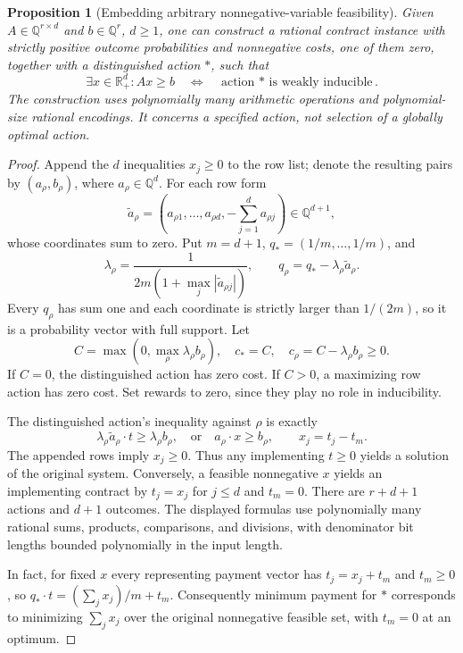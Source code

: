 \documentclass[11pt,a4paper]{article}
\newtheorem{proposition}[theorem]{Proposition}
\theoremstyle{definition}\newtheorem{definition}[theorem]{Definition}
\theoremstyle{remark}\newtheorem{remark}[theorem]{Remark}
\newcommand{\R}{\mathbb R}\newcommand{\Q}{\mathbb Q}
\newcommand{\1}{\mathbf 1}
\begin{document}
\begin{proposition}[Embedding arbitrary nonnegative-variable feasibility]\label{prop:embed}
Given $A\in\Q^{r\times d}$ and $b\in\Q^r$, $d\ge1$, one can construct a rational contract instance with strictly positive outcome probabilities and nonnegative costs, one of them zero, together with a distinguished action $*$, such that
\[
 \exists x\in\R_+^d:Ax\ge b
 \quad\Longleftrightarrow\quad
 \text{action $*$ is weakly inducible}.
\]
The construction uses polynomially many arithmetic operations and polynomial-size rational encodings. It concerns a specified action, not selection of a globally optimal action.
\end{proposition}
\begin{proof}
Append the $d$ inequalities $x_j\ge0$ to the row list; denote the resulting pairs by $(a_\rho,b_\rho)$, where $a_\rho\in\Q^d$. For each row form
\[
 \widetilde a_\rho=(a_{\rho1},\ldots,a_{\rho d},-\sum_{j=1}^d a_{\rho j})\in\Q^{d+1},
\]
whose coordinates sum to zero. Put $m=d+1$, $q_*=(1/m,\ldots,1/m)$, and
\[
 \lambda_\rho=\frac{1}{2m(1+\max_j|\widetilde a_{\rho j}|)},\qquad
 q_\rho=q_*-\lambda_\rho\widetilde a_\rho.
\]
Every $q_\rho$ has sum one and each coordinate is strictly larger than $1/(2m)$, so it is a probability vector with full support. Let
\[
 C=\max(0,\max_\rho\lambda_\rho b_\rho),\quad
 c_*=C,\quad c_\rho=C-\lambda_\rho b_\rho\ge0.
\]
If $C=0$, the distinguished action has zero cost. If $C>0$, a maximizing row action has zero cost. Set rewards to zero, since they play no role in inducibility.

The distinguished action's inequality against $\rho$ is exactly
\[
 \lambda_\rho\widetilde a_\rho\cdot t\ge\lambda_\rho b_\rho,
 \quad\text{or}\quad
 a_\rho\cdot x\ge b_\rho,
 \qquad x_j=t_j-t_m.
\]
The appended rows imply $x_j\ge0$. Thus any implementing $t\ge0$ yields a solution of the original system. Conversely, a feasible nonnegative $x$ yields an implementing contract by $t_j=x_j$ for $j\le d$ and $t_m=0$. There are $r+d+1$ actions and $d+1$ outcomes. The displayed formulas use polynomially many rational sums, products, comparisons, and divisions, with denominator bit lengths bounded polynomially in the input length.

In fact, for fixed $x$ every representing payment vector has $t_j=x_j+t_m$ and $t_m\ge0$, so
$q_*\cdot t=(\sum_jx_j)/m+t_m$. Consequently minimum payment for $*$ corresponds to minimizing $\sum_jx_j$ over the original nonnegative feasible set, with $t_m=0$ at an optimum.
\end{proof}
\end{document}
